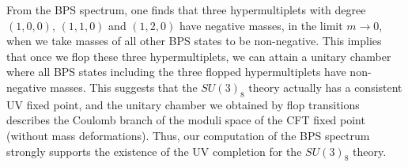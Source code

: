 From the BPS spectrum, one finds that three hypermultiplets with degree $(1,0,0)$, $(1,1,0)$ and $ (1, 2, 0) $ have negative masses, in the limit $m\rightarrow0$, when we take masses of all other BPS states to be non-negative. This implies that once we flop these three hypermultiplets, we can attain a unitary chamber where all BPS states including the three flopped hypermultiplets have non-negative masses. This suggests that the $SU(3)_8$ theory actually has a consistent UV fixed point, and the unitary chamber we obtained by flop transitions describes the Coulomb branch of the moduli space of the CFT fixed point (without mass deformations). Thus, our computation of the BPS spectrum strongly supports the existence of the UV completion for the $SU(3)_8$ theory.
